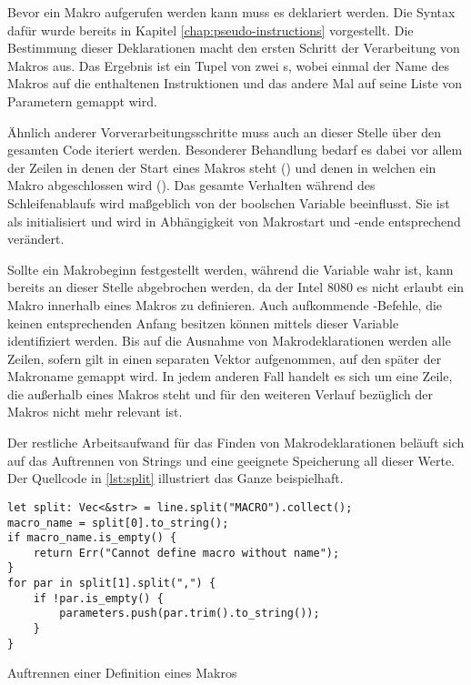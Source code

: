 Bevor ein Makro aufgerufen werden kann muss es deklariert werden. Die Syntax dafür wurde bereits in Kapitel \ref{chap:pseudo-instructions} vorgestellt. Die Bestimmung dieser Deklarationen macht den ersten Schritt der Verarbeitung von Makros aus. Das Ergebnis ist ein Tupel von zwei s, wobei einmal der Name des Makros auf die enthaltenen Instruktionen und das andere Mal auf seine Liste von Parametern gemappt wird.

Ähnlich anderer Vorverarbeitungsschritte muss auch an dieser Stelle über den gesamten Code iteriert werden. Besonderer Behandlung bedarf es dabei vor allem der Zeilen in denen der Start eines Makros steht () und denen in welchen ein Makro abgeschlossen wird (). Das gesamte Verhalten während des Schleifenablaufs wird maßgeblich von der boolschen Variable  beeinflusst. Sie ist als  initialisiert und wird in Abhängigkeit von Makrostart und -ende entsprechend verändert. 

Sollte ein Makrobeginn festgestellt werden, während die Variable wahr ist, kann bereits an dieser Stelle abgebrochen werden, da der Intel 8080 es nicht erlaubt ein Makro innerhalb eines Makros zu definieren. Auch aufkommende -Befehle, die keinen entsprechenden Anfang besitzen können mittels dieser Variable identifiziert werden. Bis auf die Ausnahme von Makrodeklarationen werden alle Zeilen, sofern  gilt in einen separaten Vektor aufgenommen, auf den später der Makroname gemappt wird. In jedem anderen Fall handelt es sich um eine Zeile, die außerhalb eines Makros steht und für den weiteren Verlauf bezüglich der Makros nicht mehr relevant ist.

Der restliche Arbeitsaufwand für das Finden von Makrodeklarationen beläuft sich auf das Auftrennen von Strings und eine geeignete Speicherung all dieser Werte. Der Quellcode in \ref{lst:split} illustriert das Ganze beispielhaft.

\begin{listing}[th]
\begin{verbatim}
let split: Vec<&str> = line.split("MACRO").collect();
macro_name = split[0].to_string();
if macro_name.is_empty() {
    return Err("Cannot define macro without name");
}
for par in split[1].split(",") {
    if !par.is_empty() {
        parameters.push(par.trim().to_string());
    }
}
\end{verbatim}
\label{lst:split}
\caption{Auftrennen einer Definition eines Makros}
\end{listing}

